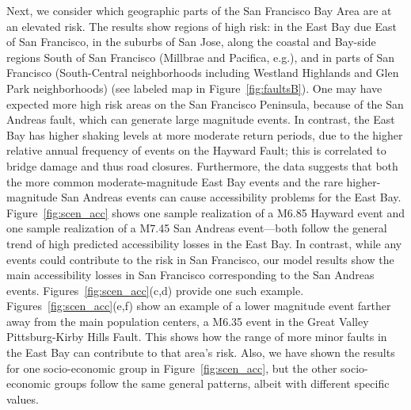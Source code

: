 




Next, we consider which geographic parts of the San Francisco Bay Area are at an elevated risk. The results show regions of high risk: in the East Bay due East of San Francisco, in the suburbs of San Jose, along the coastal and Bay-side regions South of San Francisco (Millbrae and Pacifica, e.g.), and in parts of San Francisco (South-Central neighborhoods including Westland Highlands and Glen Park neighborhoods) (see labeled map in Figure~\ref{fig:faultsB}). One may have expected more high risk areas on the San Francisco Peninsula, because of the San Andreas fault, which can generate large magnitude events. In contrast, the East Bay has higher shaking levels at more moderate return periods, due to the higher relative annual frequency of events on the Hayward Fault; this is correlated to bridge damage and thus road closures. Furthermore, the data suggests that both the more common moderate-magnitude East Bay events and the rare higher-magnitude San Andreas events can cause accessibility problems for the East Bay. Figure~\ref{fig:scen_acc} shows one sample realization of a M6.85 Hayward event and one sample realization of a M7.45 San Andreas event---both follow the general trend of  high predicted accessibility losses in the East Bay.
In contrast, while any events could contribute to the risk in San Francisco, our model results show the main accessibility losses in San Francisco corresponding to the San Andreas events.
Figures~\ref{fig:scen_acc}{(c,d)} provide one such example. Figures~\ref{fig:scen_acc}{(e,f)} show an example of a lower magnitude event farther away from the main population centers, a M6.35 event in the Great Valley Pittsburg-Kirby Hills Fault. This shows how the range of more minor faults in the East Bay can contribute to that area's risk.
Also, we have shown the results for one socio-economic group in Figure~\ref{fig:scen_acc}, but the other socio-economic groups follow the same general patterns, albeit with different specific values.


